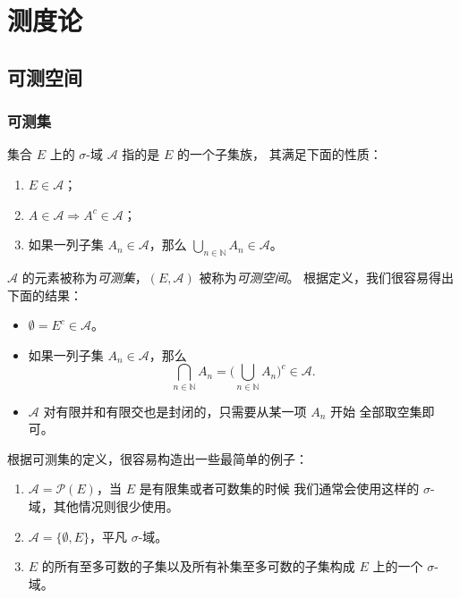 \documentclass[fontset=none]{Notes}
\begin{document}
\part{测度论}

\chapter{可测空间}

\section{可测集}

\begin{definition}
  集合 $E$ 上的 $\sigma$-域 $\mathcal{A}$ 指的是 $E$ 的一个子集族，
  其满足下面的性质：
  \begin{enumerate}
    \item $E\in \mathcal{A}$；
    \item $A\in \mathcal{A}\Rightarrow A^c\in \mathcal{A}$；
    \item 如果一列子集 $A_n\in \mathcal{A}$，那么
    $\bigcup_{n\in \mathbb{N}} A_n\in \mathcal{A}$。
  \end{enumerate}
\end{definition}

$\mathcal A$ 的元素被称为\emph{可测集}，$(E,\mathcal{A})$ 被称为\emph{可测空间}。
根据定义，我们很容易得出下面的结果：
\begin{itemize}[nosep]
  \item $\emptyset=E^c\in \mathcal{A}$。
  \item 如果一列子集 $A_n\in \mathcal{A}$，那么
  \[
    \bigcap_{n\in \mathbb{N}}A_n=\biggl(\bigcup_{n\in \mathbb{N}}A_n\biggr) ^c\in \mathcal{A}.
  \]
  \item $\mathcal{A}$ 对有限并和有限交也是封闭的，只需要从某一项 $A_n$ 开始
  全部取空集即可。
\end{itemize}

\begin{example}
  根据可测集的定义，很容易构造出一些最简单的例子：
  \begin{enumerate}
    \item $\mathcal{A}=\mathcal{P}(E)$，当 $E$ 是有限集或者可数集的时候
    我们通常会使用这样的 $\sigma$-域，其他情况则很少使用。
    \item $\mathcal{A}=\{\emptyset,E\}$，平凡 $\sigma$-域。
    \item $E$ 的所有至多可数的子集以及所有补集至多可数的子集构成
    $E$ 上的一个 $\sigma$-域。
  \end{enumerate}
\end{example}
\end{document}
